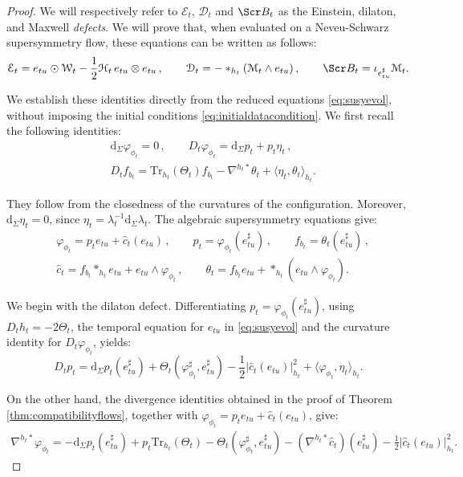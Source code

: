 \documentclass[10pt,reqno,a4paper]{amsart}
\theoremstyle{plain}
\theoremstyle{definition}
\theoremstyle{remark}
\theoremstyle{remark}
\def\dd{\mathrm{d}}
\newcommand{\Tr}{\mathrm{Tr}}
\def\cB{\Scr B}
\def\cH{\mathcal{H}}
\def\cD{\mathcal{D}}
\def\cE{\mathcal{E}}
\def\cM{\mathcal{M}}
\def\cW{\mathcal{W}}
\def\cH{\mathcal{H}}
\renewcommand{\(}{ (}
\renewcommand{\)}{ )}
\begin{document}
\begin{proof}
\noindent
We will respectively refer to $\cE_t$, $\cD_t$ and $\cB_t$ as the Einstein, dilaton, and Maxwell \emph{defects}. We will prove that, when evaluated on a Neveu-Schwarz supersymmetry flow, these equations can be written as follows:
\begin{equation}
\label{eq:reducedevolutiondefects}
\cE_t
=e_{tu}\odot\cW_t
-\frac{1}{2}\cH_t\,e_{tu}\otimes e_{tu}\, , \qquad
\cD_t=-\ast_{h_t}(\cM_t\wedge e_{tu})\, , \qquad
\cB_t=\iota_{e^{\sharp}_{tu}}\cM_t.
\end{equation}

\noindent
We establish these identities directly from the reduced equations \eqref{eq:susyevol}, without imposing the initial conditions \eqref{eq:initialdatacondition}. We first recall the following identities:
\begin{eqnarray*}
& \dd_{\Sigma}\varphi_{\phi_t}=0\, , \qquad
D_t\varphi_{\phi_t}=\dd_{\Sigma}p_t+p_t\eta_t\, ,\\
& D_tf_{b_t}
=\Tr_{h_t}(\Theta_t)f_{b_t}
-\nabla^{h_t\ast}\theta_t
+\langle\eta_t,\theta_t\rangle_{h_t}.
\end{eqnarray*}

\noindent
They follow from the closedness of the curvatures of the configuration. Moreover, $\dd_{\Sigma}\eta_t=0$, since
$\eta_t=\lambda_t^{-1}\dd_{\Sigma}\lambda_t$.
The algebraic supersymmetry equations give:
\begin{eqnarray*}
& \varphi_{\phi_t}=p_t e_{tu}+\widehat{c}_t(e_{tu})\, , \qquad
p_t=\varphi_{\phi_t}(e^{\sharp}_{tu})\, , \qquad
f_{b_t}=\theta_t(e^{\sharp}_{tu})\, ,\\
& \widehat{c}_t
=f_{b_t}\ast_{h_t}e_{tu}
+e_{tu}\wedge\varphi_{\phi_t}\, , \qquad
\theta_t
=f_{b_t}e_{tu}
+\ast_{h_t}(e_{tu}\wedge\varphi_{\phi_t}).
\end{eqnarray*}

\noindent
We begin with the dilaton defect. Differentiating
$p_t=\varphi_{\phi_t}(e^{\sharp}_{tu})$,
using $D_th_t=-2\Theta_t$, the temporal equation for $e_{tu}$ in \eqref{eq:susyevol} and the curvature identity for $D_t\varphi_{\phi_t}$, yields:
\begin{equation*}
D_tp_t
=\dd_{\Sigma}p_t(e^{\sharp}_{tu})
+\Theta_t(\varphi_{\phi_t}^{\sharp},e^{\sharp}_{tu})
-\frac{1}{2}\vert\widehat{c}_t(e_{tu})\vert_{h_t}^2
+\langle\varphi_{\phi_t},\eta_t\rangle_{h_t}.
\end{equation*}

\noindent
On the other hand, the divergence identities obtained in the proof of Theorem \ref{thm:compatibilityflows}, together with
$\varphi_{\phi_t}=p_t e_{tu}+\widehat{c}_t(e_{tu})$, give:
\begin{eqnarray*}
\nabla^{h_t\ast}\varphi_{\phi_t}
=-\dd_{\Sigma}p_t(e^{\sharp}_{tu})
+p_t\Tr_{h_t}(\Theta_t)
-\Theta_t(\varphi_{\phi_t}^{\sharp},e^{\sharp}_{tu})-(\nabla^{h_t\ast}\widehat{c}_t)(e^{\sharp}_{tu})
-\frac{1}{2}\vert\widehat{c}_t(e_{tu})\vert_{h_t}^2.
\end{eqnarray*}


\end{proof}
\end{document}
